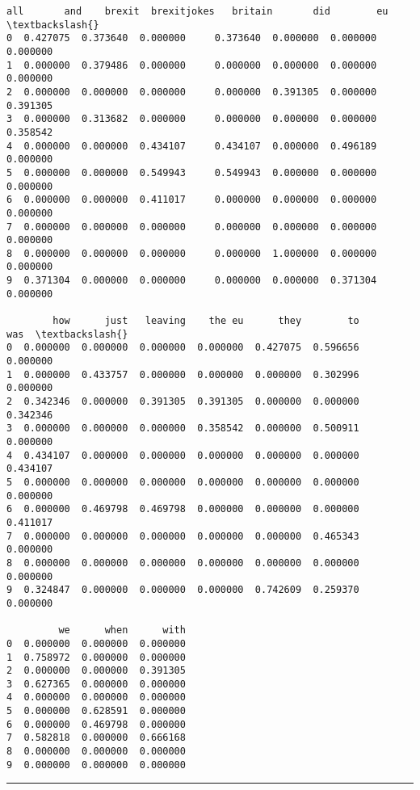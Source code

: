 \documentclass[11pt]{article}
\makeatletter
\newcommand{\boxspacing}{\kern\kvtcb@left@rule\kern\kvtcb@boxsep}
\newcommand{\prompt}[4]{
        {\ttfamily\llap{{\color{#2}[#3]:\hspace{3pt}#4}}\vspace{-\baselineskip}}
    }
\makeatother
\begin{document}
            \begin{tcolorbox}[breakable, size=fbox, boxrule=.5pt, pad at break*=1mm, opacityfill=0]
\prompt{Out}{outcolor}{23}{\boxspacing}
\begin{Verbatim}[commandchars=\\\{\}]
        all       and    brexit  brexitjokes   britain       did        eu  \textbackslash{}
0  0.427075  0.373640  0.000000     0.373640  0.000000  0.000000  0.000000
1  0.000000  0.379486  0.000000     0.000000  0.000000  0.000000  0.000000
2  0.000000  0.000000  0.000000     0.000000  0.391305  0.000000  0.391305
3  0.000000  0.313682  0.000000     0.000000  0.000000  0.000000  0.358542
4  0.000000  0.000000  0.434107     0.434107  0.000000  0.496189  0.000000
5  0.000000  0.000000  0.549943     0.549943  0.000000  0.000000  0.000000
6  0.000000  0.000000  0.411017     0.000000  0.000000  0.000000  0.000000
7  0.000000  0.000000  0.000000     0.000000  0.000000  0.000000  0.000000
8  0.000000  0.000000  0.000000     0.000000  1.000000  0.000000  0.000000
9  0.371304  0.000000  0.000000     0.000000  0.000000  0.371304  0.000000

        how      just   leaving    the eu      they        to       was  \textbackslash{}
0  0.000000  0.000000  0.000000  0.000000  0.427075  0.596656  0.000000
1  0.000000  0.433757  0.000000  0.000000  0.000000  0.302996  0.000000
2  0.342346  0.000000  0.391305  0.391305  0.000000  0.000000  0.342346
3  0.000000  0.000000  0.000000  0.358542  0.000000  0.500911  0.000000
4  0.434107  0.000000  0.000000  0.000000  0.000000  0.000000  0.434107
5  0.000000  0.000000  0.000000  0.000000  0.000000  0.000000  0.000000
6  0.000000  0.469798  0.469798  0.000000  0.000000  0.000000  0.411017
7  0.000000  0.000000  0.000000  0.000000  0.000000  0.465343  0.000000
8  0.000000  0.000000  0.000000  0.000000  0.000000  0.000000  0.000000
9  0.324847  0.000000  0.000000  0.000000  0.742609  0.259370  0.000000

         we      when      with
0  0.000000  0.000000  0.000000
1  0.758972  0.000000  0.000000
2  0.000000  0.000000  0.391305
3  0.627365  0.000000  0.000000
4  0.000000  0.000000  0.000000
5  0.000000  0.628591  0.000000
6  0.000000  0.469798  0.000000
7  0.582818  0.000000  0.666168
8  0.000000  0.000000  0.000000
9  0.000000  0.000000  0.000000
\end{Verbatim}
\end{tcolorbox}
        
    \begin{center}\rule{0.5\linewidth}{0.5pt}\end{center}
\end{document}
